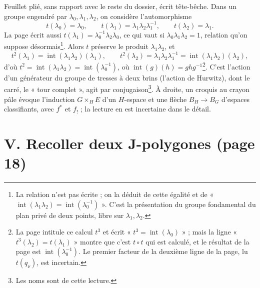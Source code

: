 \documentclass[11pt,a4paper]{article}
\begin{document}
Feuillet plié, sans rapport avec le reste du dossier, écrit tête-bêche. Dans un
groupe engendré par $\lambda_0, \lambda_1, \lambda_2$, on considère
l'automorphisme
\[
t(\lambda_0) = \lambda_0, \qquad t(\lambda_1) = \lambda_1 \lambda_2
\lambda_1^{-1}, \qquad t(\lambda_2) = \lambda_1 .
\]
La page écrit aussi $t(\lambda_1) = \lambda_0^{-1}\lambda_2\lambda_0$, ce qui
vaut si $\lambda_0 \lambda_1 \lambda_2 = 1$, relation qu'on suppose
désormais\footnote{La relation n'est pas écrite ; on la déduit de cette
égalité et de « $\operatorname{int}(\lambda_1\lambda_2) =
\operatorname{int}(\lambda_0^{-1})$ ». C'est la présentation du groupe
fondamental du plan privé de deux points, libre sur $\lambda_1, \lambda_2$.}.
Alors $t$ préserve le produit $\lambda_1 \lambda_2$, et
\[
t^2(\lambda_1) = \operatorname{int}(\lambda_1 \lambda_2)(\lambda_1), \qquad
t^2(\lambda_2) = \lambda_1 \lambda_2 \lambda_1^{-1} =
\operatorname{int}(\lambda_1 \lambda_2)(\lambda_2),
\]
d'où $t^2 = \operatorname{int}(\lambda_1\lambda_2) =
\operatorname{int}(\lambda_0^{-1})$, où $\operatorname{int}(g)(h) = g h
g^{-1}$\footnote{La page intitule ce calcul $t^3$ et écrit « $t^3 =
\operatorname{int}(\lambda_0)$ » ; mais la ligne « $t^3(\lambda_2) =
t(\lambda_1)$ » montre que c'est $t \circ t$ qui est calculé, et le résultat
de la page est $\operatorname{int}(\lambda_0^{-1})$. Le premier facteur de la
deuxième ligne de la page, lu $t(q_\nu)$, est incertain.}. C'est l'action d'un
générateur du groupe de tresses à deux brins (l'action de Hurwitz), dont le
carré, le « tour complet », agit par conjugaison\footnote{Les noms sont de
cette lecture.}. À droite, un croquis au crayon pâle évoque l'induction
$G \times_H E$ d'un $H$-espace et une flèche $B_H \to B_G$ d'espaces
classifiants, avec $f^{*}$ et $f_{!}$ ; la lecture en est incertaine dans le
détail.

\section*{V. Recoller deux J-polygones (page 18)}
\end{document}

